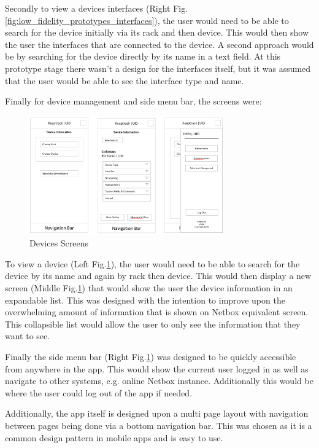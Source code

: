 \documentclass [11pt,a4paper]{article}
\begin{document}
Secondly to view a devices interfaces (Right Fig.\ref{fig:low_fidelity_prototypes_interfaces}), the user would need to be able to search for the device initially via its rack and then device. This would then show the user the interfaces that are connected to the device. A second approach would be by searching for the device directly by its name in a text field. At this prototype stage there wasn't a design for the interfaces itself, but it was assumed that the user would be able to see the interface type and name. 

Finally for device management and side menu bar, the screens were:
\begin{figure}[H]
    \centering
    \includegraphics[width=0.75\textwidth]{images/initial_prototype_devices.png}
    \caption{Devices Screens}
    \label{fig:low_fidelity_prototypes_devices}
\end{figure}

To view a device (Left Fig.\ref{fig:low_fidelity_prototypes_devices}), the user would need to be able to search for the device by its name and again by rack then device. This would then display a new screen (Middle Fig.\ref{fig:low_fidelity_prototypes_devices}) that would show the user the device information in an expandable list. This was designed with the intention to improve upon the overwhelming amount of information that is shown on Netbox equivalent screen. This collapsible list would allow the user to only see the information that they want to see.

Finally the side menu bar (Right Fig.\ref{fig:low_fidelity_prototypes_devices}) was designed to be quickly accessible from anywhere in the app. This would show the current user logged in as well as navigate to other systems, e.g. online Netbox instance. Additionally this would be where the user could log out of the app if needed.

Additionally, the app itself is designed upon a multi page layout with navigation between pages being done via a bottom navigation bar. This was chosen as it is a common design pattern in mobile apps and is easy to use. 
\end{document}
